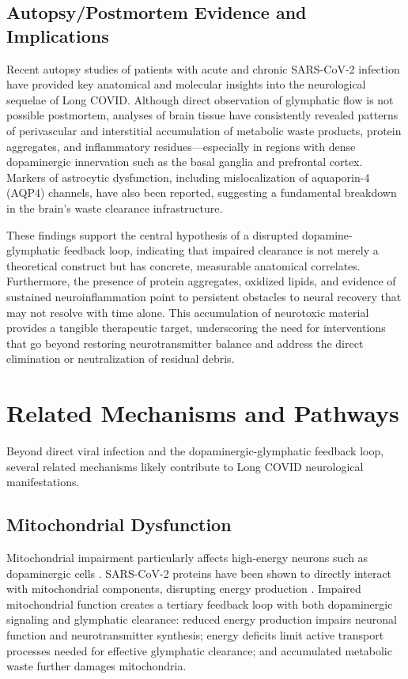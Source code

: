 \documentclass[12pt]{article}
\begin{document}
\subsection*{Autopsy/Postmortem Evidence and Implications}

Recent autopsy studies of patients with acute and chronic SARS-CoV-2 infection have provided key anatomical and molecular insights into the neurological sequelae of Long COVID. Although direct observation of glymphatic flow is not possible postmortem, analyses of brain tissue have consistently revealed patterns of perivascular and interstitial accumulation of metabolic waste products, protein aggregates, and inflammatory residues—especially in regions with dense dopaminergic innervation such as the basal ganglia and prefrontal cortex. Markers of astrocytic dysfunction, including mislocalization of aquaporin-4 (AQP4) channels, have also been reported, suggesting a fundamental breakdown in the brain’s waste clearance infrastructure.

These findings support the central hypothesis of a disrupted dopamine-glymphatic feedback loop, indicating that impaired clearance is not merely a theoretical construct but has concrete, measurable anatomical correlates. Furthermore, the presence of protein aggregates, oxidized lipids, and evidence of sustained neuroinflammation point to persistent obstacles to neural recovery that may not resolve with time alone. This accumulation of neurotoxic material provides a tangible therapeutic target, underscoring the need for interventions that go beyond restoring neurotransmitter balance and address the direct elimination or neutralization of residual debris.

\section{Related Mechanisms and Pathways}

Beyond direct viral infection and the dopaminergic-glymphatic feedback loop, several related mechanisms likely contribute to Long COVID neurological manifestations.

\subsection*{Mitochondrial Dysfunction}

Mitochondrial impairment particularly affects high-energy neurons such as dopaminergic cells \citep{stefano2021mitochondria}. SARS-CoV-2 proteins have been shown to directly interact with mitochondrial components, disrupting energy production \citep{Singh2020}. Impaired mitochondrial function creates a tertiary feedback loop with both dopaminergic signaling and glymphatic clearance: reduced energy production impairs neuronal function and neurotransmitter synthesis; energy deficits limit active transport processes needed for effective glymphatic clearance; and accumulated metabolic waste further damages mitochondria.
\end{document}
